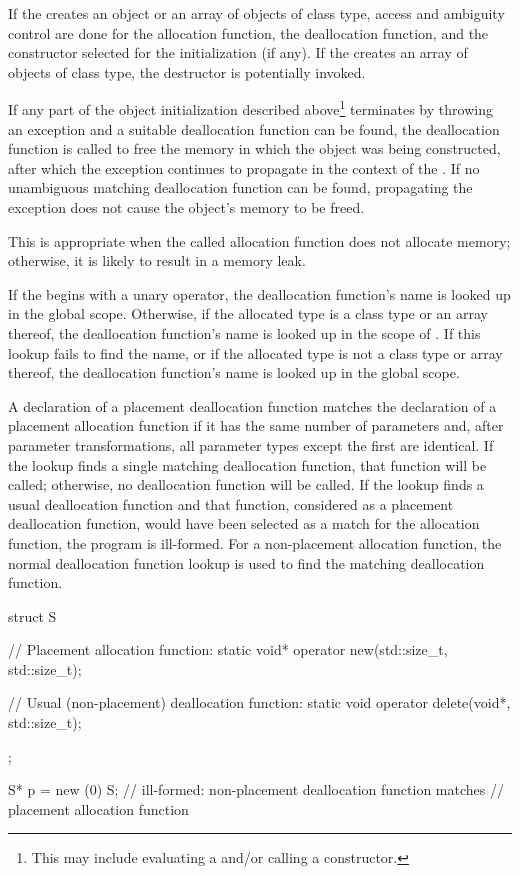 \pnum
If the  creates an object or an array of
objects of class type, access and ambiguity control are done for the
allocation function, the deallocation function, and
the constructor selected for the initialization (if any).
If the 
creates an array of objects of class type, the destructor is potentially
invoked.

\pnum
{}%
If any part of the object initialization described above\footnote{This may
include evaluating a  and/or calling
a constructor.}
terminates by throwing an exception and a suitable deallocation function
can be found, the deallocation function is called to free the memory in
which the object was being constructed, after which the exception
continues to propagate in the context of the .
If no unambiguous matching deallocation function can be found,
propagating the exception does not cause the object's memory to be
freed.
\begin{note}
This is appropriate when the called allocation function does not
allocate memory; otherwise, it is likely to result in a memory leak.
\end{note}

\pnum
If the  begins with a unary \tcode{::}
operator, the deallocation function's name is looked up in the global
scope. Otherwise, if the allocated type is a class type  or an
array thereof, the deallocation function's name is looked up in the
scope of . If this lookup fails to find the name, or if the
allocated type is not a class type or array thereof, the deallocation
function's name is looked up in the global scope.

\pnum
A declaration of a placement deallocation function matches the
declaration of a placement allocation function if it has the same number
of parameters and, after parameter transformations, all
parameter types except the first are identical. If
the lookup finds a single matching deallocation function, that function
will be called; otherwise, no deallocation function will be called. If
the lookup finds a usual deallocation
function
and that function,
considered as a placement deallocation function, would have been
selected as a match for the allocation function, the program is
ill-formed. For a non-placement allocation function, the normal deallocation
function lookup is used to find the matching deallocation
function.
\begin{example}
\begin{codeblock}
struct S {
  // Placement allocation function:
  static void* operator new(std::size_t, std::size_t);

  // Usual (non-placement) deallocation function:
  static void operator delete(void*, std::size_t);
};

S* p = new (0) S;   // ill-formed: non-placement deallocation function matches
                    // placement allocation function
\end{codeblock}

\end{example}

